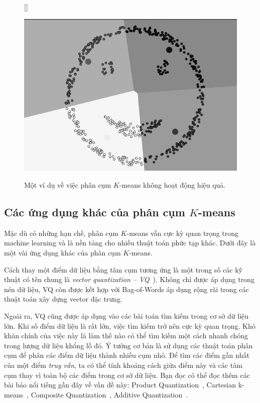 \begin{figure}[ht]
[\FBwidth]
{\caption{
Một ví dụ về việc phân cụm $K$-means không hoạt động hiệu quả.
}
\label{fig:4_face}}
{ %
\includegraphics[width=.3\textwidth]{Chapters/03_SimpleML/4_kmeans/smile_face_gray.png}
}
\end{figure}

\subsection{Các ứng dụng khác của phân cụm $K$-means}
Mặc dù có những hạn chế, phân cụm $K$-means vẫn cực kỳ quan trọng trong machine
learning và là nền tảng cho nhiều thuật toán phức tạp khác. Dưới đây là một vài ứng dụng khác của phân cụm $K$-means.

Cách thay một điểm dữ liệu bằng tâm cụm tương ứng là một trong số các
kỹ thuật có tên chung là \textit{vector quantization  --
VQ}~\cite{arya1993algorithms}). Không chỉ được áp dụng trong nén dữ liệu, VQ
còn được kết hợp với Bag-of-Words\cite{lazebnik2006beyond} áp dụng rộng rãi
trong các thuật toán xây dựng vector đặc trưng.


Ngoài ra, VQ cũng được áp dụng vào các bài toán tìm kiếm trong cơ sở dữ liệu
lớn. Khi số điểm dữ liệu là rất lớn, việc tìm kiếm trở nên cực kỳ quan
trọng. Khó khăn chính của việc này là làm thế nào có thể tìm kiếm một cách
nhanh chóng trong lượng dữ liệu khổng lồ đó. Ý tưởng cơ bản là sử dụng các
thuật toán phân cụm để phân các điểm dữ liệu thành nhiều cụm nhỏ. Để tìm các
điểm gần nhất của một điểm \textit{truy vấn}, ta có thể tính khoảng cách
giữa điểm này và các tâm cụm thay vì toàn bộ các
điểm trong cơ sở dữ liệu. Bạn đọc có thể đọc thêm các bài báo nổi tiếng gần
đây về vấn đề này: Product Quantization~\cite{jegou2011product}, Cartesian
k-means~\cite{norouzi2013cartesian,johnson2017billion}, Composite
Quantization~\cite{zhang2014composite}, Additive
Quantization~\cite{babenko2014additive}.


